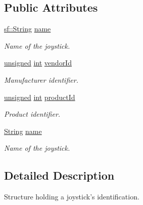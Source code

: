 \subsection*{Public Attributes}
\begin{DoxyCompactItemize}
\item 
\hyperlink{classsf_1_1_string}{sf\-::\-String} \hyperlink{structsf_1_1_joystick_1_1_identification_ac84b20872e29f18dee62bad6b02521fe}{name}
\begin{DoxyCompactList}\small\item\em Name of the joystick. \end{DoxyCompactList}\item 
\hyperlink{curses_8priv_8h_aca40206900cfc164654362fa8d4ad1e6}{unsigned} \hyperlink{term__entry_8h_ad65b480f8c8270356b45a9890f6499ae}{int} \hyperlink{structsf_1_1_joystick_1_1_identification_a827caf37a56492e3430e5ca6b15b5e9f}{vendor\-Id}
\begin{DoxyCompactList}\small\item\em Manufacturer identifier. \end{DoxyCompactList}\item 
\hyperlink{curses_8priv_8h_aca40206900cfc164654362fa8d4ad1e6}{unsigned} \hyperlink{term__entry_8h_ad65b480f8c8270356b45a9890f6499ae}{int} \hyperlink{structsf_1_1_joystick_1_1_identification_a18c21317789f51f9a5f132677727ff77}{product\-Id}
\begin{DoxyCompactList}\small\item\em Product identifier. \end{DoxyCompactList}\item 
\hyperlink{classsf_1_1_string}{String} \hyperlink{structsf_1_1_joystick_1_1_identification_a135a9a3a4dc11c2b5cde51159b4d136d}{name}
\begin{DoxyCompactList}\small\item\em Name of the joystick. \end{DoxyCompactList}\end{DoxyCompactItemize}


\subsection{Detailed Description}
Structure holding a joystick's identification. 

